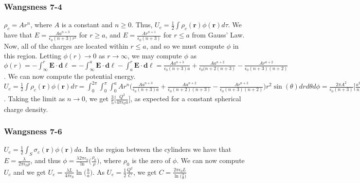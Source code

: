\documentclass[crop=false,class=book,oneside]{standalone}
\begin{document}
            \subsubsection{Wangsness 7-4}
                $\rho_c = Ar^n$, where $A$ is a constant and $n\geq 0$.
                Thus, $U_e=\frac{1}{2}\int\rho_c(\mathbf{r})\phi(\mathbf{r})d\tau$.
                We have that $E=\frac{Aa^{n+3}}{\epsilon_0 (n+3)r^2}$
                for $r\geq a$, and $E=\frac{Ar^{n+1}}{\epsilon_0(n+3)}$ for
                $r\leq a$ from Gauss' Law. Now, all of the charges are located within
                $r\leq a$, and so we must compute $\phi$ in this region.
                Letting $\phi(r)\rightarrow 0$ as $r\rightarrow \infty$,
                we may compute $\phi$ as
                $\phi(r)=-\int_{\infty}^{r}\mathbf{E}\cdot\mathbf{d\ell}=-\int_{\infty}^{a}\mathbf{E}\cdot\mathbf{d\ell}- \int_{a}^{r}\mathbf{E}\cdot \mathbf{d\ell}= \frac{Aa^{n+3}}{\epsilon_0(n+3)a}+\frac{Aa^{n+2}}{\epsilon_0(n+2(n+3)}-\frac{Ar^{n+2}}{\epsilon_0(n+3)(n+2)}$.
                We can now compute the potential energy.
                $U_e=\frac{1}{2}\int\rho_c(\mathbf{r})\phi(\mathbf{r})d\tau=\int_{0}^{2\pi}\int_{0}^{\pi}\int_{0}^{a}Ar^n \bigg(\frac{Aa^{n+3}}{\epsilon_0(n+3)a}+\frac{Aa^{n+2}}{\epsilon_0(n+2)(n+3)}-\frac{Ar^{n+2}}{\epsilon_0(n+3)(n+2)}\bigg)r^2 \sin(\theta)dr d\theta d\phi = \frac{2\pi A^2}{\epsilon_0 (n+3)}\bigg[\frac{a^{2n+5}}{n+3}+\frac{a^{2n+5}}{(n+2)(n+3)}-\frac{a^{2n+5}}{(n+2)(2n+5)}\bigg]$.
                Taking the limit as $n\rightarrow 0$, we get $\frac{3}{5}\bigg[\frac{Q^2}{4\pi \epsilon_0 a}\bigg]$,
                as expected for a constant spherical charge density.
            \subsubsection{Wangsness 7-6}
                $U_e = \frac{1}{2}\int_{S}\sigma_c(\mathbf{r})\phi(\mathbf{r})da$.
                In the region between the cylinders we have that
                $E=\frac{\lambda}{2\pi\epsilon_0\rho}$, and thus
                $\phi= \frac{\lambda 2\pi \epsilon_0}\ln\big(\frac{\rho_0}{\rho}\big)$,
                where $\rho_0$ is the zero of $\phi$. We can now compute $U_e$
                and we get $U_e = \frac{\lambda L}{4\pi\epsilon_0}\ln\big(\frac{b}{a}\big)$.
                As $U_e = \frac{1}{2}\frac{Q^2}{C}$, we get
                $C=\frac{2\pi \epsilon_0 L}{\ln\big(\frac{b}{a}\big)}$
\end{document}
